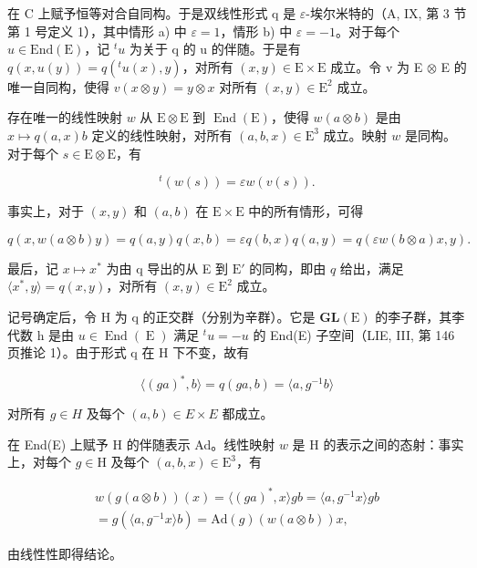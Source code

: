 在 C 上赋予恒等对合自同构。于是双线性形式 q 是 \(\varepsilon\)-埃尔米特的（A, IX, 第 3 节第 1 号定义 1），其中情形 a) 中 \(\varepsilon = 1\)，情形 b) 中 \(\varepsilon = -1\)。对于每个 \(u \in \text{End}(\text{E})\)，记 \({}^{t}u\) 为关于 q 的 u 的伴随。于是有 \(q(x, u(y)) = q(^{t}u(x), y)\)，对所有 \((x, y) \in \text{E} \times \text{E}\) 成立。令 v 为 E \(\otimes\) E 的唯一自同构，使得 \(v(x \otimes y) = y \otimes x\) 对所有 \((x, y) \in \text{E}^{2}\) 成立。

存在唯一的线性映射 \(w\) 从 \(\mathrm{E} \otimes \mathrm{E}\) 到 \(\operatorname{End}(\mathrm{E})\)，使得 \(w(a \otimes b)\) 是由 \(x \mapsto q(a, x)b\) 定义的线性映射，对所有 \((a, b, x) \in \mathrm{E}^3\) 成立。映射 \(w\) 是同构。对于每个 \(s \in \mathrm{E} \otimes \mathrm{E}\)，有

\[
{ } ^ { t } ( w ( s ) ) = \varepsilon w ( v ( s ) ) .\tag{3}
\]

事实上，对于 \((x,y)\) 和 \((a,b)\) 在 \(\mathrm{E} \times \mathrm{E}\) 中的所有情形，可得

\[
q (x, w (a \otimes b) y) = q (a, y) q (x, b) = \varepsilon q (b, x) q (a, y) = q (\varepsilon w (b \otimes a) x, y).
\]

最后，记 \(x \mapsto x^*\) 为由 q 导出的从 E 到 \(\mathrm{E}'\) 的同构，即由 \(q\) 给出，满足 \(\langle x^*, y \rangle = q(x, y)\)，对所有 \((x, y) \in \mathrm{E}^2\) 成立。

记号确定后，令 H 为 q 的正交群（分别为辛群）。它是 \(\mathbf{GL}(\mathrm{E})\) 的李子群，其李代数 h 是由 \(u \in \operatorname{End}(\operatorname{E})\) 满足 \(^{t}u = -u\) 的 End(E) 子空间（LIE, III, 第 146 页推论 1）。由于形式 q 在 H 下不变，故有

\[
\langle (g a) ^ {*}, b \rangle = q (g a, b) = \langle a, g ^ {- 1} b \rangle
\]

对所有 \(g \in H\) 及每个 \((a, b) \in E \times E\) 都成立。

在 End(E) 上赋予 H 的伴随表示 Ad。线性映射 \(w\) 是 H 的表示之间的态射：事实上，对每个 \(g \in \mathrm{H}\) 及每个 \((a, b, x) \in \mathrm{E}^3\)，有

\[
\begin{array}{c} w (g   (a \otimes b)) (x) = \langle (g a) ^ {*}, x \rangle   g b = \langle a, g ^ {- 1} x \rangle   g b \\ = g   (\langle a, g ^ {- 1} x \rangle   b) = \mathrm{Ad} (g) (w (a \otimes b)) x, \end{array}
\]

由线性性即得结论。

